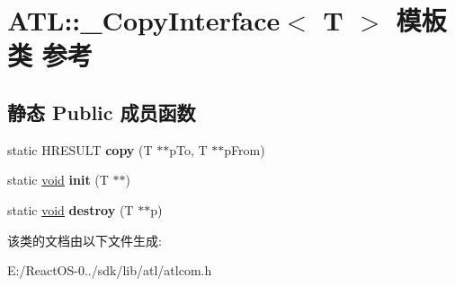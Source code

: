 \hypertarget{class_a_t_l_1_1___copy_interface}{}\section{A\+TL\+:\+:\+\_\+\+Copy\+Interface$<$ T $>$ 模板类 参考}
\label{class_a_t_l_1_1___copy_interface}
\subsection*{静态 Public 成员函数}
\begin{DoxyCompactItemize}
\item 
\mbox{\label{class_a_t_l_1_1___copy_interface_a23e0b3d5abe19a767405b88bcf561630}} 
static H\+R\+E\+S\+U\+LT {\bfseries copy} (T $\ast$$\ast$p\+To, T $\ast$$\ast$p\+From)
\item 
\mbox{\label{class_a_t_l_1_1___copy_interface_a56f02cb9c516ab55dffbdcfcec2b3a61}} 
static \hyperlink{interfacevoid}{void} {\bfseries init} (T $\ast$$\ast$)
\item 
\mbox{\label{class_a_t_l_1_1___copy_interface_a55050b6340e2bf630aa186404ea4bab9}} 
static \hyperlink{interfacevoid}{void} {\bfseries destroy} (T $\ast$$\ast$p)
\end{DoxyCompactItemize}


该类的文档由以下文件生成\+:\begin{DoxyCompactItemize}
\item 
E\+:/\+React\+O\+S-\/0../sdk/lib/atl/atlcom.\+h\end{DoxyCompactItemize}
